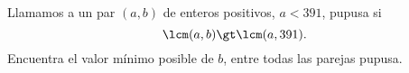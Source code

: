 Llamamos a un par $(a,b)$ de enteros positivos, $a\lt391$, pupusa si
\[\lcm(a,b)\gt\lcm(a,391).\]
Encuentra el valor mínimo posible de $b$, entre todas las parejas pupusa.
